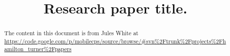 \documentclass[conference]{IEEEtran}
\begin{document}
\title{Research paper title.}
\author{
}

\maketitle

\begin{abstract}
  The content in this document is from Jules White at
  \url{https://code.google.com/p/mobilecps/source/browse/#svn%2Ftrunk%2Fprojects%2Fhamilton_turner%2Fpapers}
\end{abstract}

\IEEEpeerreviewmaketitle











\end{document}
